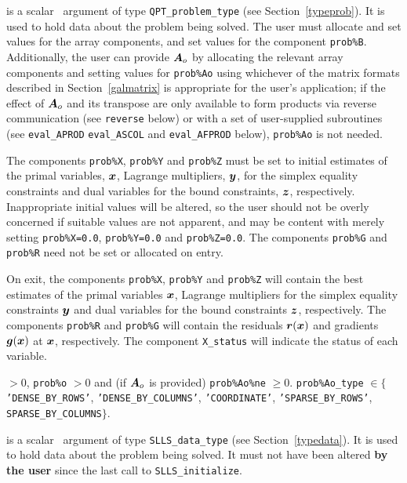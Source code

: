\documentclass{galahad}
\newcommand{\packagename}{SLLS}
\begin{document}
\begin{description}
 is a scalar \intentinout\ argument of type
{\tt QPT\_problem\_type}
(see Section~\ref{typeprob}).
It is used to hold data about the problem being solved.
The user must allocate and set values for the array components,
and set values for the component {\tt prob\%B}.
Additionally, the user can provide ${\bm{A}}_o$ by allocating the
relevant array components and setting values for {\tt prob\%Ao}
using whichever
of the matrix formats described in Section~\ref{galmatrix}
is appropriate for the user's application;
if the effect of ${\bm{A}}_o$ and its transpose are only available to form products
via reverse communication (see {\tt reverse} below)
or with a set of user-supplied subroutines (see {\tt eval\_APROD}
{\tt eval\_ASCOL} and {\tt eval\_AFPROD} below), {\tt prob\%Ao} is not needed.

The components {\tt prob\%X}, {\tt prob\%Y} and {\tt prob\%Z}
must be set to initial estimates of the primal variables, ${\bm{x}}$,
Lagrange multipliers, ${\bm{y}}$, for the simplex equality constraints
and dual variables for the bound constraints, ${\bm{z}}$, respectively.
Inappropriate initial values will be altered, so the user should
not be overly concerned if suitable values are not apparent, and may be
content with merely setting {\tt prob\%X=0.0}, {\tt prob\%Y=0.0}
and {\tt prob\%Z=0.0}.
The components {\tt prob\%G} and {\tt prob\%R}
need not be set or allocated on entry.

On exit, the components {\tt prob\%X}, {\tt prob\%Y} and {\tt prob\%Z}
will contain the best estimates of the primal variables ${\bm{x}}$,
Lagrange multipliers for the simplex equality constraints ${\bm{y}}$
and dual variables for the bound constraints ${\bm{z}}$, respectively.
The components {\tt prob\%R} and {\tt prob\%G}
will contain the residuals ${\bm{r}}({\bm{x}})$
and gradients ${\bm{g}}({\bm{x}})$ at ${\bm{x}}$, respectively.
The component {\tt X\_status} will indicate the status of each variable.

 $> 0$, {\tt prob\%o} $> 0$
              and (if ${\bm{A}}_o$ is provided) {\tt prob\%Ao\%ne} $\geq 0$.
              {\tt prob\%Ao\_type} $\in 
               \{${\tt 'DENSE\_\-BY\_ROWS'}, {\tt 'DENSE\_BY\_COLUMNS'},
                  {\tt 'COORDINATE'}, {\tt 'SPARSE\_BY\_\-ROWS'}, 
                  {\tt SPARSE\_BY\_COLUMNS}$\}$.

 is a scalar \intentinout\ argument of type
{\tt \packagename\_data\_type}
(see Section~\ref{typedata}). It is used to hold data about the problem being
solved. It must not have been altered {\bf by the user} since the last call to
{\tt \packagename\_initialize}.


\end{description}
\end{document}
